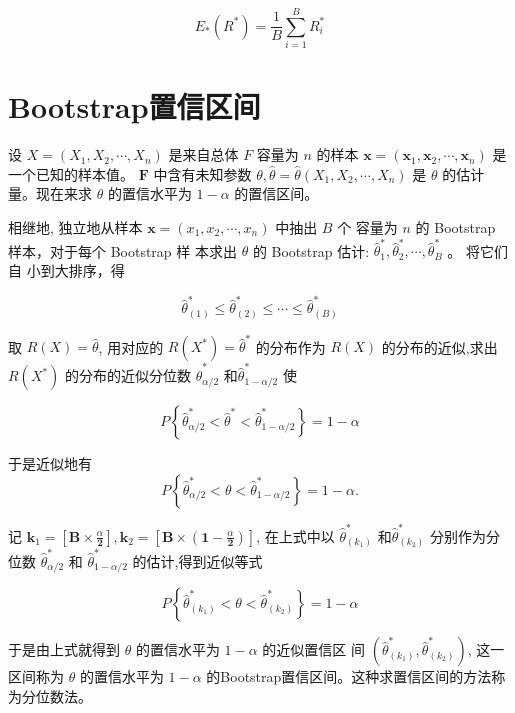 $$ E_{*}\left(R^{*}\right)=\frac{1}{B} \sum_{i=1}^{B} R_{i}^{*} $$

\section{Bootstrap置信区间}

设 $ X=\left(X_{1}, X_{2}, \cdots, X_{n}\right) $ 是来自总体 $ F $ 容量为 $ n $ 的样本 $ \boldsymbol{x}=\left(\boldsymbol{x}_{1}, \boldsymbol{x}_{2}, \cdots, \boldsymbol{x}_{n}\right) $ 是一个已知的样本值。 $ \boldsymbol{F} $ 中含有未知参数 $ \theta, \hat{\theta}=\hat{\theta}\left(X_{1}, X_{2}, \cdots, X_{n}\right) $ 是 $ \theta $ 的估计量。现在来求 $ \theta $ 的置信水平为 $ 1-\alpha $ 的置信区间。

相继地, 独立地从样本 $ \boldsymbol{x}=\left(x_{1}, x_{2}, \cdots, x_{n}\right) $ 中抽出 $ B $ 个 容量为 $ n $ 的 Bootstrap 样本，对于每个 Bootstrap 样 本求出 $ \theta $ 的 Bootstrap 估计: $ \hat{\theta}_{1}^{*}, \hat{\theta}_{2}^{*}, \cdots, \hat{\theta}_{B}^{*} $ 。 将它们自 小到大排序，得

$$ \hat{\theta}_{(1)}^{*} \leq \hat{\theta}_{(2)}^{*} \leq \cdots \leq \hat{\theta}_{(B)}^{*} $$

取 $ R(X)=\hat{\theta} $, 用对应的 $ R\left(X^{*}\right)=\hat{\theta}^{*} $ 的分布作为 $ R(X) $ 的分布的近似,求出 $ R\left(X^{*}\right) $ 的分布的近似分位数 $ \hat{\theta}_{\alpha / 2}^{*} $ 和$ \hat{\theta}_{1-\alpha / 2}^{*} $ 使

$$ P\left\{\hat{\theta}_{\alpha / 2}^{*}<\hat{\theta}^{*}<\hat{\theta}_{1-\alpha / 2}^{*}\right\}=1-\alpha $$

于是近似地有
$$
P\left\{\hat{\theta}_{\alpha / 2}^{*}<\theta<\hat{\theta}_{1-\alpha / 2}^{*}\right\}=1-\alpha .
$$

记 $ \boldsymbol{k}_{1}=\left[\boldsymbol{B} \times \frac{\alpha}{\mathbf{2}}\right], \boldsymbol{k}_{2}=\left[\boldsymbol{B} \times\left(\mathbf{1}-\frac{\alpha}{\mathbf{2}}\right)\right] $, 在上式中以 $ \hat{\theta}_{\left(k_{1}\right)}^{*} $ 和$ \hat{\theta}_{\left(k_{2}\right)}^{*} $ 分别作为分位数 $ \hat{\theta}_{\alpha / 2}^{*} $ 和 $ \hat{\theta}_{1-\alpha / 2}^{*} $ 的估计,得到近似等式

$$ P\left\{\hat{\theta}_{\left(k_{1}\right)}^{*}<\theta<\hat{\theta}_{\left(k_{2}\right)}^{*}\right\}=1-\alpha $$

于是由上式就得到 $ \theta $ 的置信水平为 $ 1-\alpha $ 的近似置信区 间 $ \left(\hat{\theta}_{\left(k_{1}\right)}^{*}, \hat{\theta}_{\left(k_{2}\right)}^{*}\right) $, 这一区间称为 $ \theta $ 的置信水平为 $ 1-\alpha $ 的Bootstrap置信区间。这种求置信区间的方法称为分位数法。

